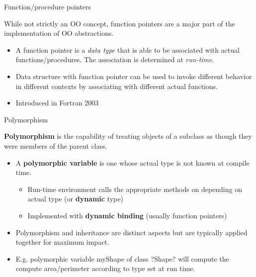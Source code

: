 \documentclass[11pt]{beamer}
\begin{document}

\begin{frame}{Function/procedure pointers}

While not strictly an OO concept, function pointers are a major part of the implementation of OO abstractions.
\begin{itemize}

  \item A function pointer is a \emph{data type} that is able to be associated with actual functions/procedures. The association is determined at \emph{run-time}.

  \item Data structure with function pointer can be used to invoke different behavior in different contexts by associating with different actual functions.
  \item Introduced in Fortran 2003
  
 \end{itemize}

\end{frame}




\begin{frame}{Polymorphism}

\textbf{Polymorphism} is the capability of treating objects of a subclass as though they were members of the parent class.
\begin{itemize}

  \item A \textbf{polymorphic variable} is one whose actual type is not known at compile time.
    \begin{itemize}
    \item Run-time environment calls the appropriate methods on depending on actual type (or \textbf{dynamic} type)
    \item Implemented with \textbf{dynamic binding} (usually function pointers)
    \end{itemize}

  \item Polymorphism and inheritance are distinct aspects but are typically applied together for maximum impact.
  \item E.g. polymorphic variable myShape of class ?Shape? will compute the compute area/perimeter according to type set at run time.
  
 \end{itemize}

\end{frame}
\end{document}

